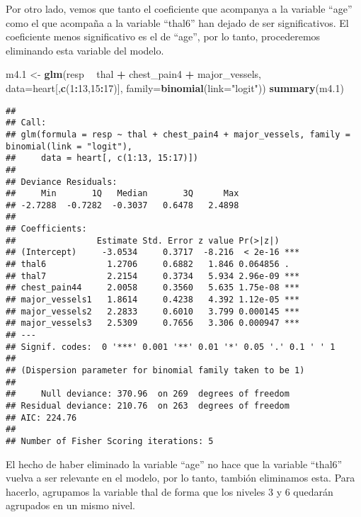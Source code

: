 \documentclass[]{article}
\newenvironment{Shaded}{\begin{snugshade}}{\end{snugshade}}
\newcommand{\KeywordTok}[1]{\textcolor[rgb]{0.13,0.29,0.53}{\textbf{#1}}}
\newcommand{\DataTypeTok}[1]{\textcolor[rgb]{0.13,0.29,0.53}{#1}}
\newcommand{\DecValTok}[1]{\textcolor[rgb]{0.00,0.00,0.81}{#1}}
\newcommand{\StringTok}[1]{\textcolor[rgb]{0.31,0.60,0.02}{#1}}
\newcommand{\OperatorTok}[1]{\textcolor[rgb]{0.81,0.36,0.00}{\textbf{#1}}}
\newcommand{\NormalTok}[1]{#1}
\begin{document}
Por otro lado, vemos que tanto el coeficiente que acompanya a la
variable ``age'' como el que acompaña a la variable ``thal6'' han dejado
de ser significativos. El coeficiente menos significativo es el de
``age'', por lo tanto, procederemos eliminando esta variable del modelo.

\begin{Shaded}
\begin{Highlighting}[]
\NormalTok{m4.}\DecValTok{1}\NormalTok{ <-}\StringTok{  }\KeywordTok{glm}\NormalTok{(resp }\OperatorTok{~}\StringTok{ }\NormalTok{thal }\OperatorTok{+}\StringTok{ }\NormalTok{chest_pain4 }\OperatorTok{+}\StringTok{ }\NormalTok{major_vessels, }\DataTypeTok{data=}\NormalTok{heart[,}\KeywordTok{c}\NormalTok{(}\DecValTok{1}\OperatorTok{:}\DecValTok{13}\NormalTok{,}\DecValTok{15}\OperatorTok{:}\DecValTok{17}\NormalTok{)], }\DataTypeTok{family=}\KeywordTok{binomial}\NormalTok{(}\DataTypeTok{link=}\StringTok{"logit"}\NormalTok{)) }
\KeywordTok{summary}\NormalTok{(m4.}\DecValTok{1}\NormalTok{)}
\end{Highlighting}
\end{Shaded}

\begin{verbatim}
## 
## Call:
## glm(formula = resp ~ thal + chest_pain4 + major_vessels, family = binomial(link = "logit"), 
##     data = heart[, c(1:13, 15:17)])
## 
## Deviance Residuals: 
##     Min       1Q   Median       3Q      Max  
## -2.7288  -0.7282  -0.3037   0.6478   2.4898  
## 
## Coefficients:
##                Estimate Std. Error z value Pr(>|z|)    
## (Intercept)     -3.0534     0.3717  -8.216  < 2e-16 ***
## thal6            1.2706     0.6882   1.846 0.064856 .  
## thal7            2.2154     0.3734   5.934 2.96e-09 ***
## chest_pain44     2.0058     0.3560   5.635 1.75e-08 ***
## major_vessels1   1.8614     0.4238   4.392 1.12e-05 ***
## major_vessels2   2.2833     0.6010   3.799 0.000145 ***
## major_vessels3   2.5309     0.7656   3.306 0.000947 ***
## ---
## Signif. codes:  0 '***' 0.001 '**' 0.01 '*' 0.05 '.' 0.1 ' ' 1
## 
## (Dispersion parameter for binomial family taken to be 1)
## 
##     Null deviance: 370.96  on 269  degrees of freedom
## Residual deviance: 210.76  on 263  degrees of freedom
## AIC: 224.76
## 
## Number of Fisher Scoring iterations: 5
\end{verbatim}

El hecho de haber eliminado la variable ``age'' no hace que la variable
``thal6'' vuelva a ser relevante en el modelo, por lo tanto, tambión
eliminamos esta. Para hacerlo, agrupamos la variable thal de forma que
los niveles 3 y 6 quedarán agrupados en un mismo nivel.
\end{document}
